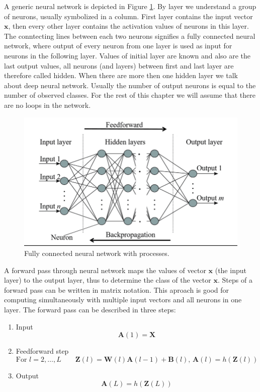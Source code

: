  
A generic neural network is depicted in Figure \ref*{img:fullyNN}.  By layer we understand a group of neurons, usually symbolized in a column. First layer contains the input vector $\bm{x}$, then every other layer contains the activation values of neurons in this layer. The conntecting lines between each two neurons signifies a fully connected neural network, where  output of every neuron from one layer is used as input for neurons in the following layer. Values of initial layer are known and also are the last output values, all neurons (and layers) between first and last layer are therefore called hidden. When there are more then one hidden layer we talk about deep neural network. Usually the number of output neurons is equal to the number of observed classes. For the rest of this chapter we will assume that there are no loops in the network.\cite{DIP}

\begin{figure}[hbtp]
    \centering
    \includegraphics[scale=0.5]{obrazky/fullyNN.png}

    \caption{Fully connected neural network with processes.\cite{nn1}}
    \label{img:fullyNN}
\end{figure}

A forward pass through neural network maps the values of vector $\bm{x}$ (the input layer)  to the output layer, thus to determine the class of the vector $\bm{x}$. Steps of a forward pass can be written in matrix notation. This aproach is good for computing simultaneously with multiple input vectors and all neurons in one layer. The forward pass can be described in three steps:

\begin{enumerate}
    \item Input \begin{equation}\bm{A}(1)=\bm{X}\end{equation}
    \item Feedforward step 
    \begin{equation}\mbox{For } l = 2, \dots, L \qquad \bm{Z}(l) = \bm{W}(l)\bm{A}(l-1)+\bm{B}(l) \mbox{, } \bm{A}(l)=h(\bm{Z}(l))\end{equation}
    \item Output \begin{equation}\bm{A}(L)=h(\bm{Z}(L))\end{equation}
\end{enumerate}


